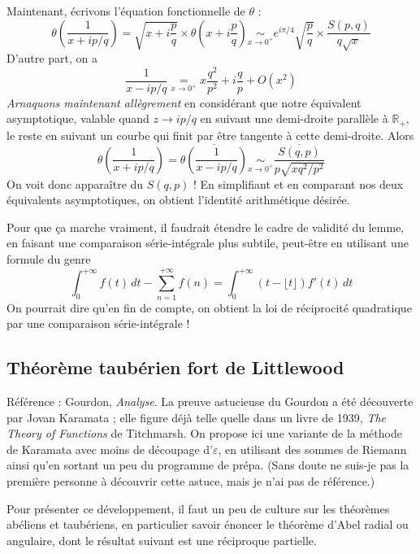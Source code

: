 \documentclass[a4paper, 11pt]{article}
\def\R{\mathbb{R}}
\begin{document}
Maintenant, écrivons l'équation fonctionnelle de $\theta$ :
  \[ \theta\left( \frac{1}{x + ip/q} \right) =
    \sqrt{x + i\frac{p}{q}} \times \theta\left( x + i\frac{p}{q} \right)
    \underset{x \to 0^+}{\sim} e^{i\pi/4} \sqrt{\frac{p}{q}}
    \times \frac{S(p,q)}{q\sqrt{x}}
  \]
D'autre part, on a
  \[ \frac{1}{x - ip/q} \underset{x \to 0^+}{=}
    x\frac{q^2}{p^2} + i \frac{q}{p} + O(x^2)  \]
\emph{Arnaquons maintenant allègrement} en considérant que notre équivalent
asymptotique, valable quand $z \to ip/q$ en suivant une demi-droite parallèle à
$\R_+$, le reste en suivant un courbe qui finit par être tangente à cette
demi-droite. Alors
\[ \theta\left( \frac{1}{x + ip/q} \right)
  = \overline{\theta\left( \frac{1}{x - ip/q} \right)}
    \underset{x \to 0^+}{\sim} \frac{\overline{S(q,p)}}{p\sqrt{xq^2/p^2}}
  \]
  On voit donc apparaître du $S(q,p)$ ! En simplifiant et en comparant nos deux
  équivalents asymptotiques, on obtient l'identité arithmétique désirée.

Pour que ça marche vraiment, il faudrait étendre le cadre de validité du lemme,
en faisant une comparaison série-intégrale plus subtile, peut-être en utilisant
une formule du genre
  \[ \int_0^{+\infty} f(t)\,dt - \sum_{n=1}^{+\infty} f(n) =
    \int_0^{+\infty} (t - \lfloor t \rfloor)f'(t)\,dt
  \]
  On pourrait dire qu'en fin de compte, on obtient la loi de réciprocité
  quadratique par une comparaison série-intégrale !


\newpage

\subsection{Théorème taubérien fort de Littlewood}
\label{tauber}

Référence : Gourdon, \emph{Analyse}. La preuve astucieuse du Gourdon a été
découverte par Jovan Karamata ; elle figure déjà telle quelle dans un livre de
1939, \emph{The Theory of Functions} de Titchmarsh. On propose ici une variante
de la méthode de Karamata avec moins de découpage d'$\varepsilon$, en utilisant
des sommes de Riemann ainsi qu'en sortant un peu du programme de prépa. (Sans
doute ne suis-je pas la première personne à découvrir cette astuce, mais je n'ai
pas de référence.)

Pour présenter ce développement, il faut un peu de culture sur les théorèmes
abéliens et taubériens, en particulier savoir énoncer le théorème d'Abel radial
ou angulaire, dont le résultat suivant est une réciproque partielle.
\end{document}
